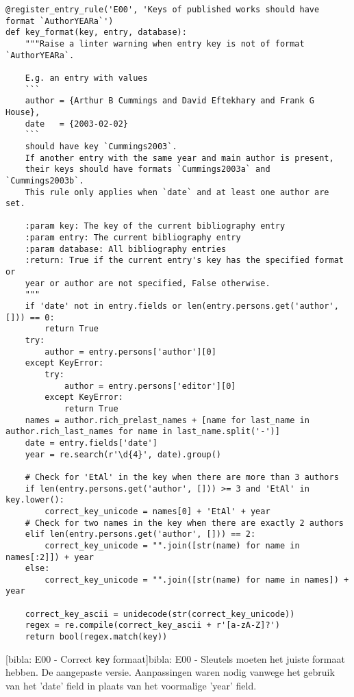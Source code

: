 \begin{verbatim}
@register_entry_rule('E00', 'Keys of published works should have format `AuthorYEARa`')
def key_format(key, entry, database):
    """Raise a linter warning when entry key is not of format `AuthorYEARa`.

    E.g. an entry with values
    ```
    author = {Arthur B Cummings and David Eftekhary and Frank G House},
    date   = {2003-02-02}
    ```
    should have key `Cummings2003`.
    If another entry with the same year and main author is present,
    their keys should have formats `Cummings2003a` and `Cummings2003b`.
    This rule only applies when `date` and at least one author are set.

    :param key: The key of the current bibliography entry
    :param entry: The current bibliography entry
    :param database: All bibliography entries
    :return: True if the current entry's key has the specified format or
    year or author are not specified, False otherwise.
    """
    if 'date' not in entry.fields or len(entry.persons.get('author', [])) == 0:
        return True
    try:
        author = entry.persons['author'][0]
    except KeyError:
        try:
            author = entry.persons['editor'][0]
        except KeyError:
            return True
    names = author.rich_prelast_names + [name for last_name in author.rich_last_names for name in last_name.split('-')]
    date = entry.fields['date']
    year = re.search(r'\d{4}', date).group()

    # Check for 'EtAl' in the key when there are more than 3 authors
    if len(entry.persons.get('author', [])) >= 3 and 'EtAl' in key.lower():
        correct_key_unicode = names[0] + 'EtAl' + year
    # Check for two names in the key when there are exactly 2 authors
    elif len(entry.persons.get('author', [])) == 2:
        correct_key_unicode = "".join([str(name) for name in names[:2]]) + year
    else:
        correct_key_unicode = "".join([str(name) for name in names]) + year

    correct_key_ascii = unidecode(str(correct_key_unicode))
    regex = re.compile(correct_key_ascii + r'[a-zA-Z]?')
    return bool(regex.match(key))
\end{verbatim}
[bibla: E00 - Correct \texttt{key} formaat]{bibla: E00 - Sleutels moeten het juiste formaat hebben. De aangepaste versie. Aanpassingen waren nodig vanwege het gebruik van het 'date' field in plaats van het voormalige 'year' field. \label{lst:bibla_AR_E00}}


